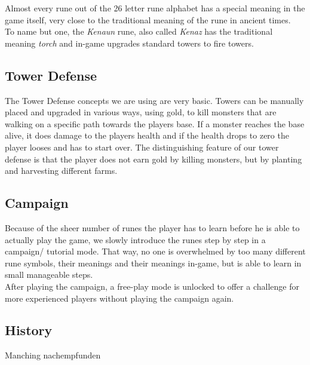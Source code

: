 Almost every rune out of the 26 letter rune alphabet has a special meaning in the game itself, very close to the traditional meaning of the rune in ancient times.\\
To name but one, the \emph{Kenaun} rune, also called \emph{Kenaz} has the traditional meaning \emph{torch} and in-game upgrades standard towers to fire towers.

\subsection{Tower Defense}
\label{sec:game_design:subsec:tower_defense}

The Tower Defense concepts we are using are very basic. Towers can be manually placed and upgraded in various ways, using gold, to kill monsters that are walking on a specific path towards the players base. If a monster reaches the base alive, it does damage to the players health and if the health drops to zero the player looses and has to start over. 
The distinguishing feature of our tower defense is that the player does not earn gold by killing monsters, but by planting and harvesting different farms.



\subsection{Campaign}
\label{sec:game_design:subsec:campaign}

Because of the sheer number of runes the player has to learn before he is able to actually play the game, we slowly introduce the runes step by step in a campaign/ tutorial mode. That way, no one is overwhelmed by too many different rune symbols, their meanings and their meanings in-game, but is able to learn in small manageable steps. \\
After playing the campaign, a free-play mode is unlocked to offer a challenge for more experienced players without playing the campaign again. \\

\subsection{History}
\label{sec:game_design:subsec:history}


Manching nachempfunden


